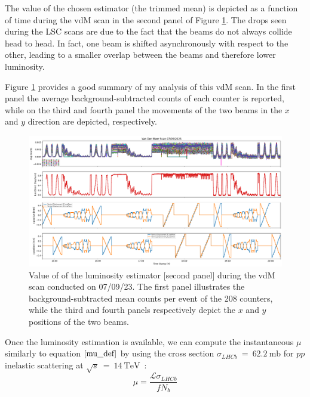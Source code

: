 The value of the chosen estimator (the trimmed mean) is depicted as a function of time during the vdM scan in the second panel of Figure \ref{fig:lumi_result_all}. The drops seen during the LSC scans are due to the fact that the beams do not always collide head to head. In fact, one beam is shifted asynchronously with respect to the other, leading to a smaller overlap between the beams and therefore lower luminosity. 

Figure \ref{fig:lumi_result_all} provides a good summary of my analysis of this vdM scan. In the first panel the average background-subtracted counts of each counter is reported, while on the third and fourth panel the movements of the two beams in the $x$ and $y$ direction are depicted, respectively.

\begin{figure}
    \centering
    \includegraphics[width=\textwidth]{figures/lumi_plot.png}
    \caption{Value of of the luminosity estimator [second panel] during the vdM scan conducted on 07/09/23.
The first panel illustrates the background-subtracted mean counts per event of the 208 counters, while the third and fourth
panels respectively depict the $x$ and $y$ positions of the two beams.}
    \label{fig:lumi_result_all}
\end{figure}

Once the luminosity estimation is available, we can compute the instantaneous $\mu$ similarly to equation $\eqref{mu_def}$ by using the cross section $\sigma_{LHCb}~=~\SI{62.2}{\milli\barn}$ for $pp$ inelastic scattering at $\sqrt{s}~=~\SI{14}{\tera\eV}$~\cite{Aaij:2310870}:
\begin{equation}
    \mu = \frac{\mathcal{L}\sigma_{LHCb}}{f N_b}\label{inst_mu}
\end{equation}




